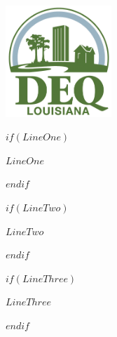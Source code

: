 \includegraphics[width=0.3\textwidth]{images/logo.png}\\[0.1cm] %
	
  
\vfill
  

$if(LineOne)$
\begin{center}
{{$LineOne$}}\\[1\baselineskip]
\end{center}
$endif$

$if(LineTwo)$
\begin{center}
{{$LineTwo$}}\\[1\baselineskip]
\end{center}
$endif$

$if(LineThree)$
\begin{center}
{{$LineThree$}}\\[1\baselineskip]
\end{center}
$endif$
